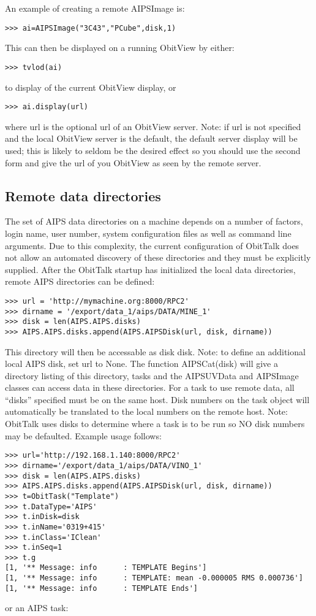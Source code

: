 \documentclass[11pt]{report}
\begin{document}
An example of creating a remote AIPSImage is:
\begin{verbatim}
>>> ai=AIPSImage("3C43","PCube",disk,1)
\end{verbatim}
This can then be displayed on a running ObitView by either:
\begin{verbatim}
>>> tvlod(ai)
\end{verbatim}
to display of the current ObitView display, or
\begin{verbatim}
>>> ai.display(url)
\end{verbatim}
where url is the optional url of an ObitView server.
Note: if url is not specified and the local ObitView 
server is the default, the default server display will be used;
this is likely to seldom be the desired effect so you should use the 
second form and give the url of you ObitView as seen by the  
remote server.

\subsection{Remote data directories\label{remote_data}}
The set of AIPS data directories on a machine depends on a number of
factors, login name, user number, system configuration files as well
as command line arguments.
Due to this complexity, the current configuration of ObitTalk does not
allow an automated discovery of these directories and they must be
explicitly supplied.
After the ObitTalk startup has initialized the local data directories,
remote AIPS directories can be defined:

\begin{verbatim}
>>> url = 'http://mymachine.org:8000/RPC2'
>>> dirname = '/export/data_1/aips/DATA/MINE_1'
>>> disk = len(AIPS.AIPS.disks)
>>> AIPS.AIPS.disks.append(AIPS.AIPSDisk(url, disk, dirname))
\end{verbatim}
This directory will then be accessable as disk disk.
Note: to define an additional local AIPS disk, set url to None.
The function AIPSCat(disk) will give a directory listing of this
directory, tasks and the AIPSUVData and AIPSImage classes can access
data in these directories.
For a task to use remote data, all ``disks'' specified must be on the
same host.
Disk numbers on the task object will automatically be translated to
the  local numbers on the remote host.
Note: ObitTalk uses disks to determine where a task is to be run so NO
disk numbers may be defaulted.
Example usage follows:
\begin{verbatim}
>>> url='http://192.168.1.140:8000/RPC2'
>>> dirname='/export/data_1/aips/DATA/VINO_1'
>>> disk = len(AIPS.AIPS.disks)
>>> AIPS.AIPS.disks.append(AIPS.AIPSDisk(url, disk, dirname))
>>> t=ObitTask("Template")
>>> t.DataType='AIPS'
>>> t.inDisk=disk
>>> t.inName='0319+415'
>>> t.inClass='IClean'
>>> t.inSeq=1
>>> t.g
[1, '** Message: info      : TEMPLATE Begins']
[1, '** Message: info      : TEMPLATE: mean -0.000005 RMS 0.000736']
[1, '** Message: info      : TEMPLATE Ends']
\end{verbatim}
or an AIPS task:
\end{document}
